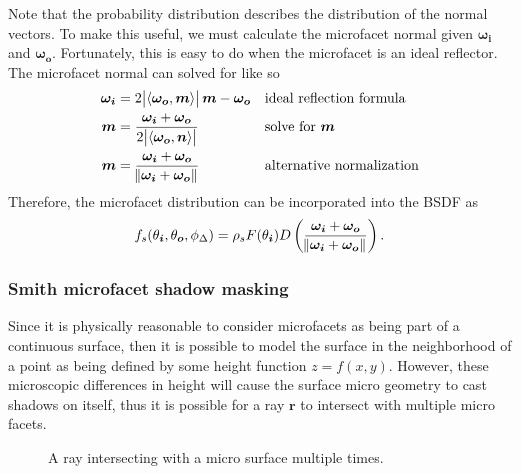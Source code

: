 \documentclass[12pt]{article}
\DeclarePairedDelimiter\ip{\langle }{\rangle}
\begin{document}
Note that the probability distribution describes the distribution of the normal vectors.
To make this useful, we must calculate the microfacet normal given \(\bm{\omega_i}\) and \(\bm{\omega_o}\).
Fortunately, this is easy to do when the microfacet is an ideal reflector.
The microfacet normal can solved for like so
\begin{align*}
  \bm{\omega_i} &= 2\abs{\ip{\bm{\omega_o}, \bm m}}\bm m-  \bm{\omega_o} && \text{ideal reflection formula}\\
  \bm m &= \frac{\bm{\omega_i} + \bm{\omega_o}}{2\abs{\ip{\bm{\omega_o}, \bm n}}} && \text{solve for \(\bm m\)}\\
  \bm m &= \frac{\bm{\omega_i} + \bm{\omega_o}}{\norm{\bm{\omega_i} + \bm{\omega_o}}} && \text{alternative normalization}
\end{align*}
Therefore, the microfacet distribution can be incorporated into the BSDF as
\[f_s(\theta_{\bm i}, \theta_{\bm o}, \phi_\Delta) = \rho_sF(\theta_{\bm i})D\del{\frac{\bm{\omega_i} + \bm{\omega_o}}{\norm{\bm{\omega_i} + \bm{\omega_o}}}}.\]

\subsubsection{Smith microfacet shadow masking}

Since it is physically reasonable to consider microfacets as being part of a continuous surface, then it is possible to model the surface in the neighborhood of a point as being defined by some height function \(z = f(x, y)\).
However, these microscopic differences in height will cause the surface micro geometry to cast shadows on itself, thus it is possible for a ray \( \bm r\) to intersect with multiple micro facets.
\begin{figure}[H]
  \centering
  \caption{A ray intersecting with a micro surface multiple times.}
\end{figure}
\end{document}
